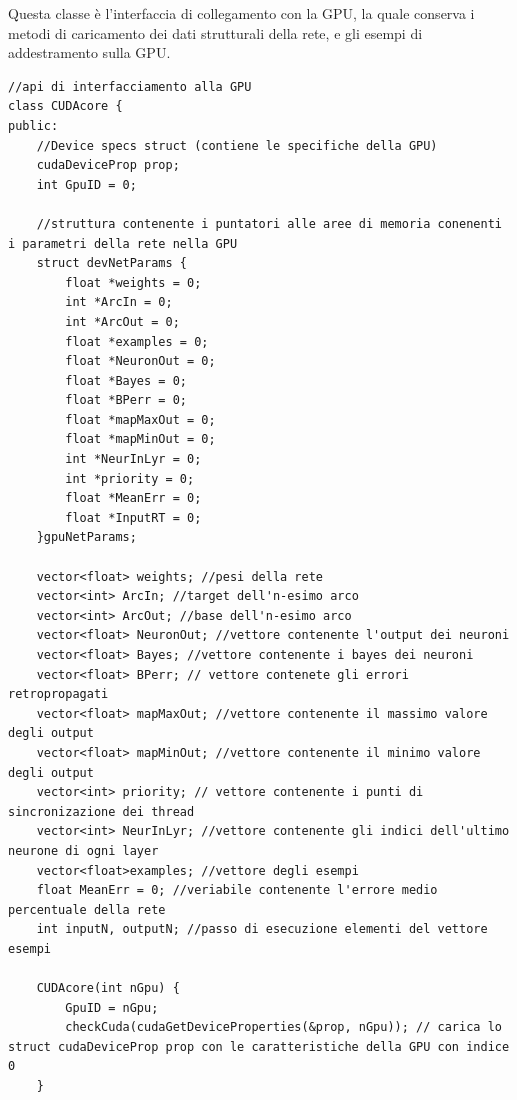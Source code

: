 \documentclass[10pt,a4paper]{article}
\begin{document}
Questa classe è l'interfaccia di collegamento con la GPU, la quale conserva i metodi di caricamento dei dati strutturali della rete, e gli esempi di addestramento sulla GPU.
\begin{lstlisting}[style=mycuda, caption= classe di interfaccia alla GPU, captionpos=b]
//api di interfacciamento alla GPU
class CUDAcore {
public:
	//Device specs struct (contiene le specifiche della GPU)
	cudaDeviceProp prop; 
	int GpuID = 0;

	//struttura contenente i puntatori alle aree di memoria conenenti i parametri della rete nella GPU
	struct devNetParams {
		float *weights = 0;
		int *ArcIn = 0;
		int *ArcOut = 0;
		float *examples = 0;
		float *NeuronOut = 0;
		float *Bayes = 0;
		float *BPerr = 0;
		float *mapMaxOut = 0;
		float *mapMinOut = 0;
		int *NeurInLyr = 0;
		int *priority = 0;
		float *MeanErr = 0;
		float *InputRT = 0;
	}gpuNetParams;

	vector<float> weights; //pesi della rete
	vector<int> ArcIn; //target dell'n-esimo arco
	vector<int> ArcOut; //base dell'n-esimo arco
	vector<float> NeuronOut; //vettore contenente l'output dei neuroni
	vector<float> Bayes; //vettore contenente i bayes dei neuroni
	vector<float> BPerr; // vettore contenete gli errori retropropagati
	vector<float> mapMaxOut; //vettore contenente il massimo valore degli output
	vector<float> mapMinOut; //vettore contenente il minimo valore degli output
	vector<int> priority; // vettore contenente i punti di sincronizazione dei thread
	vector<int> NeurInLyr; //vettore contenente gli indici dell'ultimo neurone di ogni layer
	vector<float>examples; //vettore degli esempi
	float MeanErr = 0; //veriabile contenente l'errore medio percentuale della rete
	int inputN, outputN; //passo di esecuzione elementi del vettore esempi

	CUDAcore(int nGpu) {
		GpuID = nGpu;
		checkCuda(cudaGetDeviceProperties(&prop, nGpu)); // carica lo struct cudaDeviceProp prop con le caratteristiche della GPU con indice 0
	}
	
\end{lstlisting}
\end{document}
